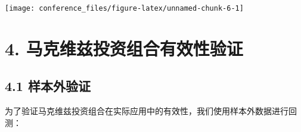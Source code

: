\documentclass[
]{article}
\begin{document}
\begin{center}\texttt{[image: conference\_files/figure-latex/unnamed-chunk-6-1]} \end{center}

\section{4.
马克维兹投资组合有效性验证}\label{ux9a6cux514bux7ef4ux5179ux6295ux8d44ux7ec4ux5408ux6709ux6548ux6027ux9a8cux8bc1}

\subsection{4.1 样本外验证}\label{ux6837ux672cux5916ux9a8cux8bc1}

为了验证马克维兹投资组合在实际应用中的有效性，我们使用样本外数据进行回测：
\end{document}
